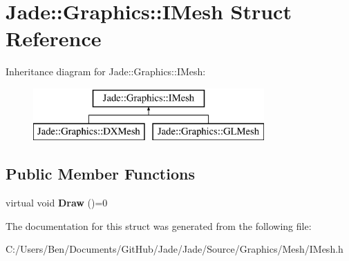 \hypertarget{struct_jade_1_1_graphics_1_1_i_mesh}{}\section{Jade\+:\+:Graphics\+:\+:I\+Mesh Struct Reference}
\label{struct_jade_1_1_graphics_1_1_i_mesh}
Inheritance diagram for Jade\+:\+:Graphics\+:\+:I\+Mesh\+:\begin{figure}[H]
\begin{center}
\leavevmode
\includegraphics[height=2.000000cm]{struct_jade_1_1_graphics_1_1_i_mesh}
\end{center}
\end{figure}
\subsection*{Public Member Functions}
\begin{DoxyCompactItemize}
\item 
\hypertarget{struct_jade_1_1_graphics_1_1_i_mesh_af5b1c2069f9f4b72b1a4cf97fa3b090a}{}virtual void {\bfseries Draw} ()=0\label{struct_jade_1_1_graphics_1_1_i_mesh_af5b1c2069f9f4b72b1a4cf97fa3b090a}

\end{DoxyCompactItemize}


The documentation for this struct was generated from the following file\+:\begin{DoxyCompactItemize}
\item 
C\+:/\+Users/\+Ben/\+Documents/\+Git\+Hub/\+Jade/\+Jade/\+Source/\+Graphics/\+Mesh/I\+Mesh.\+h\end{DoxyCompactItemize}
